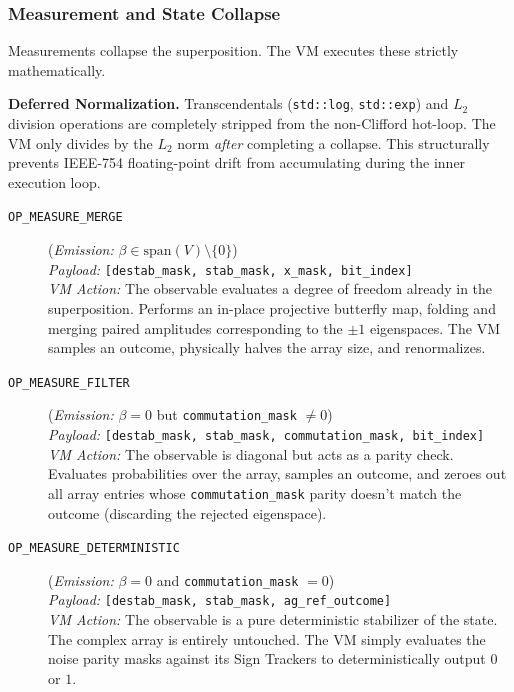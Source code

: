 \documentclass[11pt]{article}
\begin{document}
\subsubsection*{Measurement and State Collapse}
Measurements collapse the superposition. The VM executes these strictly mathematically.

\textbf{Deferred Normalization.} Transcendentals (\texttt{std::log}, \texttt{std::exp}) and $L_2$ division operations are completely stripped from the non-Clifford hot-loop. The VM only divides by the $L_2$ norm \textit{after} completing a collapse. This structurally prevents IEEE-754 floating-point drift from accumulating during the inner execution loop.

\begin{description}
    \item[\texttt{OP\_MEASURE\_MERGE}] (\textit{Emission:} $\beta \in \text{span}(V) \setminus \{0\}$) \\
    \textit{Payload:} \texttt{[destab\_mask, stab\_mask, x\_mask, bit\_index]}\\
    \textit{VM Action:} The observable evaluates a degree of freedom already in the superposition. Performs an in-place projective butterfly map, folding and merging paired amplitudes corresponding to the $\pm 1$ eigenspaces. The VM samples an outcome, physically halves the array size, and renormalizes.

    \item[\texttt{OP\_MEASURE\_FILTER}] (\textit{Emission:} $\beta = 0$ but \texttt{commutation\_mask} $\neq 0$) \\
    \textit{Payload:} \texttt{[destab\_mask, stab\_mask, commutation\_mask, bit\_index]}\\
    \textit{VM Action:} The observable is diagonal but acts as a parity check. Evaluates probabilities over the array, samples an outcome, and zeroes out all array entries whose \texttt{commutation\_mask} parity doesn't match the outcome (discarding the rejected eigenspace).

    \item[\texttt{OP\_MEASURE\_DETERMINISTIC}] (\textit{Emission:} $\beta = 0$ and \texttt{commutation\_mask} $= 0$) \\
    \textit{Payload:} \texttt{[destab\_mask, stab\_mask, ag\_ref\_outcome]}\\
    \textit{VM Action:} The observable is a pure deterministic stabilizer of the state. The complex array is entirely untouched. The VM simply evaluates the noise parity masks against its Sign Trackers to deterministically output $0$ or $1$.


\end{description}
\end{document}

